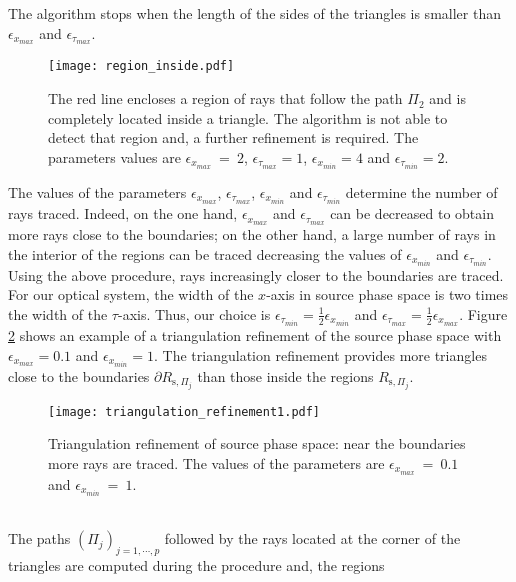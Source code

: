 The algorithm stops when the length of the sides of the triangles is smaller than $\epsilon_{x_{max}}$ and $\epsilon_{\tau_{max}}$.
\begin{figure}[t]
  \begin{center}
  \texttt{[image: region\_inside.pdf]}
  \end{center}
  \caption{\footnotesize{The red line encloses a region of rays that follow the path $\Pi_2$ and is completely located inside a triangle.
  The algorithm is not able to detect that region and, a further refinement is required.
    The parameters values are $\epsilon_{x_{max}}~=~ 2$, $\epsilon_{\tau_{max}}= 1$, $\epsilon_{x_{min}}= 4$ and $\epsilon_{\tau_{min}}=2$. }}
   \label{fig:region inside}
  \end{figure}
The values of the parameters $\epsilon_{x_{max}}$, $\epsilon_{\tau_{max}}$, $\epsilon_{x_{min}}$ and $\epsilon_{\tau_{min}}$ determine the number of rays traced.
Indeed, on the one hand, $\epsilon_{x_{max}}$ and $\epsilon_{\tau_{max}}$ can be decreased to obtain more rays close to the boundaries;
on the other hand, a large number of rays in the interior of the regions can be traced decreasing the values of $\epsilon_{x_{min}}$ and $\epsilon_{\tau_{min}}$. %
\newline
\indent Using the above procedure, rays increasingly closer to the boundaries are traced.
For our optical system, the width of the $x$-axis in source phase space is two times the width of the $\tau$-axis.
Thus, our choice is $\epsilon_{\tau_{min}}=\frac{1}{2}\epsilon_{x_{min}}$ and $\epsilon_{\tau_{max}} = \frac{1}{2}\epsilon_{x_{max}}$.
Figure \ref{fig:triangulation_refinement} shows an example of a triangulation refinement of the source phase space with $\epsilon_{x_{max}}=0.1$ and $\epsilon_{x_{min}}=1$.
The triangulation refinement provides more triangles close to the boundaries $\partial R_{\textrm{s}, \Pi_j}$ than those inside the regions $R_{\textrm{s}, \Pi_j}$.
\begin{figure}[h]
  \begin{center}
  \texttt{[image: triangulation\_refinement1.pdf]}
  \end{center}
  \caption{\footnotesize{Triangulation refinement of source phase space:
  near the boundaries more rays are traced.
    The values of the parameters are $\epsilon_{x_{max}}~=~ 0.1$ and $\epsilon_{x_{min}}~=~1$.}}
   \label{fig:triangulation_refinement}
  \end{figure}
 \\ \indent The paths $(\Pi_j)_{j = 1, \cdots, p}$ followed by the rays located at the corner of the triangles are computed during the procedure and, the regions
